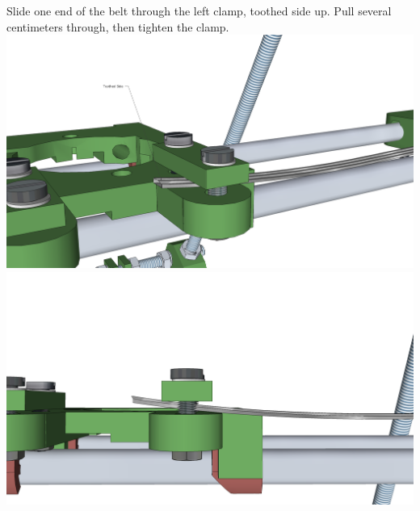 \documentclass[twoside,openany,a4paper,titlepage]{memoir}
\begin{document}
	\section{}
	Slide one end of the belt through the left clamp, toothed side up. Pull several centimeters through, then
	tighten the clamp.\\
	\includegraphics[width=1\linewidth]{graphics/ch9_14_1.png}
	\includegraphics[width=1\linewidth]{graphics/ch9_14_2.png}
	
\end{document}
